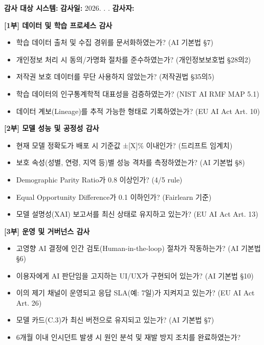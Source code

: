 \begin{tcolorbox}[colback=white, colframe=black!70, title={[Template C.6] 알고리즘 감사 체크리스트 (연간)}]
\textbf{감사 대상 시스템:} \underline{\hspace{3cm}} \quad \textbf{감사일:} 2026. \hspace{0.3cm} . \hspace{0.3cm} . \quad \textbf{감사자:} \underline{\hspace{2cm}}

\vspace{0.5em}
\textbf{[1부] 데이터 및 학습 프로세스 감사}
\begin{itemize}
    \item[$\square$] 학습 데이터 출처 및 수집 경위를 문서화하였는가? \hfill (AI 기본법 §7)
    \item[$\square$] 개인정보 처리 시 동의/가명화 절차를 준수하였는가? \hfill (개인정보보호법 §28의2)
    \item[$\square$] 저작권 보호 데이터를 무단 사용하지 않았는가? \hfill (저작권법 §35의5)
    \item[$\square$] 학습 데이터의 인구통계학적 대표성을 검증하였는가? \hfill (NIST AI RMF MAP 5.1)
    \item[$\square$] 데이터 계보(Lineage)를 추적 가능한 형태로 기록하였는가? \hfill (EU AI Act Art. 10)
\end{itemize}

\textbf{[2부] 모델 성능 및 공정성 감사}
\begin{itemize}
    \item[$\square$] 현재 모델 정확도가 배포 시 기준값 ±[X]\% 이내인가? \hfill (드리프트 임계치)
    \item[$\square$] 보호 속성(성별, 연령, 지역 등)별 성능 격차를 측정하였는가? \hfill (AI 기본법 §8)
    \item[$\square$] Demographic Parity Ratio가 0.8 이상인가? \hfill (4/5 rule)
    \item[$\square$] Equal Opportunity Difference가 0.1 이하인가? \hfill (Fairlearn 기준)
    \item[$\square$] 모델 설명성(XAI) 보고서를 최신 상태로 유지하고 있는가? \hfill (EU AI Act Art. 13)
\end{itemize}

\textbf{[3부] 운영 및 거버넌스 감사}
\begin{itemize}
    \item[$\square$] 고영향 AI 결정에 인간 검토(Human-in-the-loop) 절차가 작동하는가? \hfill (AI 기본법 §6)
    \item[$\square$] 이용자에게 AI 판단임을 고지하는 UI/UX가 구현되어 있는가? \hfill (AI 기본법 §10)
    \item[$\square$] 이의 제기 채널이 운영되고 응답 SLA(예: 7일)가 지켜지고 있는가? \hfill (EU AI Act Art. 26)
    \item[$\square$] 모델 카드(C.3)가 최신 버전으로 유지되고 있는가? \hfill (AI 기본법 §7)
    \item[$\square$] 6개월 이내 인시던트 발생 시 원인 분석 및 재발 방지 조치를 완료하였는가?
\end{itemize}


\end{tcolorbox}
